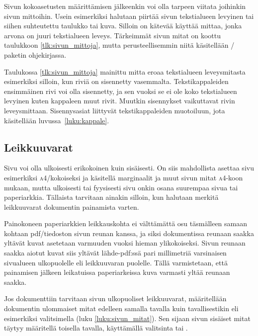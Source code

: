 Sivun kokoasetusten määrittämisen jälkeenkin voi olla tarpeen viitata
joihinkin sivun mittoihin. Usein esimerkiksi halutaan piirtää sivun
tekstialueen levyinen tai siihen suhteutettu taulukko tai kuva. Silloin
on kätevää käyttää mittaa, jonka arvona on juuri tekstialueen leveys.
Tärkeimmät sivun mitat on koottu taulukkoon \ref{tlk:sivun_mittoja},
mutta perusteellisemmin niitä käsitellään \-/
paketin ohjekirjassa.

Taulukossa \ref{tlk:sivun_mittoja} mainittu mitta 
eroaa tekstialueen leveysmitasta  esimerkiksi silloin,
kun riviä on sisennetty vasemmalta. Tekstikappaleiden ensimmäinen rivi
voi olla sisennetty, ja sen vuoksi se ei ole koko tekstialueen levyinen
kuten kappaleen muut rivit. Muutkin sisennykset vaikuttavat rivin
leveysmittaan. Sisennysasiat liittyvät tekstikappaleiden muotoiluun,
jota käsitellään luvussa~\ref{luku:kappale}.

\subsection{Leikkuuvarat}

Sivu voi olla ulkoisesti erikokoinen kuin sisäisesti. On siis
mahdollista asettaa sivu esimerkiksi \textsc{a4}\-/kokoiseksi ja
käsitellä marginaalit ja muut sivun mitat \textsc{a4}-koon mukaan, mutta
ulkoisesti tai fyysisesti sivu onkin osana suurempaa sivua tai
paperiarkkia. Tällaista tarvitaan ainakin silloin, kun halutaan
merkitä leikkuuvarat dokumentin painamista varten.

Painokoneen paperiarkkien leikkauskohta ei välttämättä osu täsmälleen
samaan kohtaan pdf\-/tiedoston sivun reunan kanssa, ja siksi
dokumentissa reunaan saakka yltävät kuvat asetetaan varmuuden vuoksi
hieman ylikokoiseksi. Sivun reunaan saakka aiotut kuvat siis yltävät
lähde-pdf:ssä pari millimetriä varsinaisen sivualueen ulkopuolelle eli
leikkuuvaran puolelle. Tällä varmistetaan, että painamisen jälkeen
leikatuissa paperiarkeissa kuva varmasti yltää reunaan saakka.

Jos dokumenttiin tarvitaan sivun ulkopuoliset leikkuuvarat, määritellään
dokumentin ulommaiset mitat edelleen samalla tavalla kuin
tavallisestikin eli esimerkiksi valitsimella  (luku
\ref{luku:sivun_mitat}).  
Sen sijaan sivun sisäiset mitat täytyy määritellä toisella tavalla,
käyttämällä valitsinta  tai .


